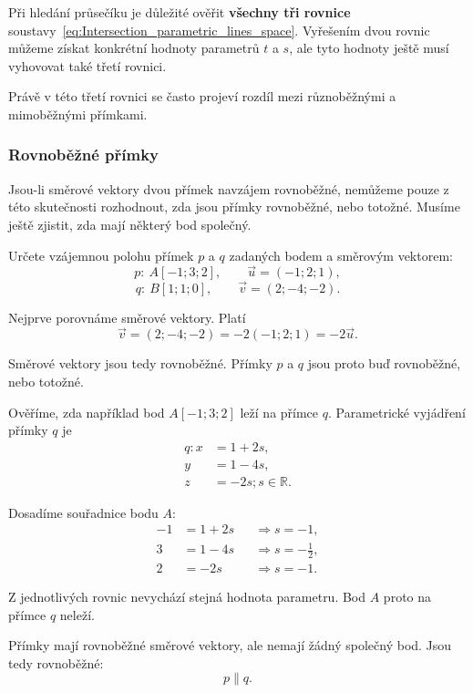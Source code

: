 \begin{remark}
    Při hledání průsečíku je důležité ověřit \textbf{všechny tři rovnice}
    soustavy~\eqref{eq:Intersection_parametric_lines_space}.
    Vyřešením dvou rovnic můžeme získat konkrétní hodnoty parametrů
    $t$ a $s$, ale tyto hodnoty ještě musí vyhovovat také třetí rovnici.

    Právě v této třetí rovnici se často projeví rozdíl mezi různoběžnými
    a mimoběžnými přímkami.
\end{remark}


\subsubsection{Rovnoběžné přímky}
\label{subsubsec:Parallel_parametric_lines_space}

Jsou-li směrové vektory dvou přímek navzájem rovnoběžné, nemůžeme
pouze z této skutečnosti rozhodnout, zda jsou přímky rovnoběžné,
nebo totožné. Musíme ještě zjistit, zda mají některý bod společný.

\begin{example}
    \label{exa:Parallel_parametric_lines_space}
    Určete vzájemnou polohu přímek $p$ a $q$ zadaných bodem
    a směrovým vektorem:
    \[
        p:\ A[-1;3;2],
        \qquad
        \vec{u}=(-1;2;1),
    \]
    \[
        q:\ B[1;1;0],
        \qquad
        \vec{v}=(2;-4;-2).
    \]

    Nejprve porovnáme směrové vektory. Platí
    \[
        \vec{v}
        =
        (2;-4;-2)
        =
        -2(-1;2;1)
        =
        -2\vec{u}.
    \]

    Směrové vektory jsou tedy rovnoběžné. Přímky $p$ a $q$ jsou
    proto buď rovnoběžné, nebo totožné.

    Ověříme, zda například bod $A[-1;3;2]$ leží na přímce $q$.
    Parametrické vyjádření přímky $q$ je
    \[
        \begin{aligned}
            q: x&=1+2s,\\
            y&=1-4s,\\
            z&=-2s; s\in\mathbb{R}.
        \end{aligned}
    \]

    Dosadíme souřadnice bodu $A$:
    \begin{align*}
        -1&=1+2s
        &&\Rightarrow s=-1,\\
        3&=1-4s
        &&\Rightarrow s=-\frac12,\\
        2&=-2s
        &&\Rightarrow s=-1.
    \end{align*}

    Z jednotlivých rovnic nevychází stejná hodnota parametru.
    Bod $A$ proto na přímce $q$ neleží.

    Přímky mají rovnoběžné směrové vektory, ale nemají žádný
    společný bod. Jsou tedy rovnoběžné:
    \[
        p\parallel q.
    \]
\end{example}

